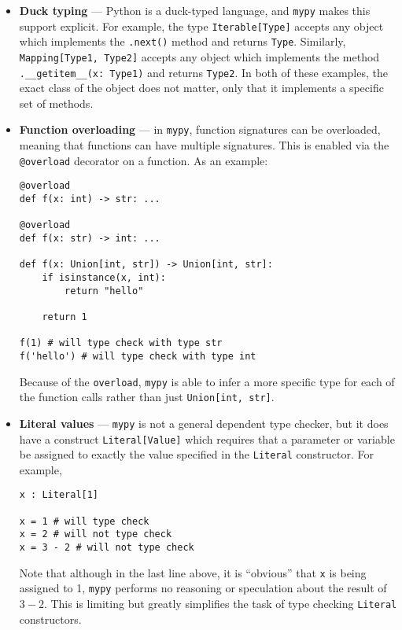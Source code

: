 \documentclass[12pt]{report}
\begin{document}
\begin{itemize}
    \item \textbf{Duck typing} --- Python is a duck-typed language, and \texttt{mypy} makes this support explicit. For example, the type \texttt{Iterable[Type]} accepts any object which implements the \texttt{.next()} method and returns \texttt{Type}. Similarly, \texttt{Mapping[Type1, Type2]} accepts any object which implements the method \texttt{.__getitem__(x: Type1)} and returns \texttt{Type2}. In both of these examples, the exact class of the object does not matter, only that it implements a specific set of methods.

    \item \textbf{Function overloading} --- in \texttt{mypy}, function signatures can be overloaded, meaning that functions can have multiple signatures. This is enabled via the \texttt{@overload} decorator on a function. As an example:

    \begin{singlespace*}
    \begin{verbatim}
@overload
def f(x: int) -> str: ...

@overload
def f(x: str) -> int: ...

def f(x: Union[int, str]) -> Union[int, str]:
    if isinstance(x, int):
        return "hello"

    return 1

f(1) # will type check with type str
f('hello') # will type check with type int\end{verbatim}
    \end{singlespace*}
    Because of the \texttt{overload}, \texttt{mypy} is able to infer a more specific type for each of the function calls rather than just \texttt{Union[int, str]}.

    \item \textbf{Literal values} --- \texttt{mypy} is not a general dependent type checker, but it does have a construct \texttt{Literal[Value]} which requires that a parameter or variable be assigned to exactly the value specified in the \texttt{Literal} constructor. For example,

    \begin{singlespace*}
        \begin{verbatim}
x : Literal[1]

x = 1 # will type check
x = 2 # will not type check
x = 3 - 2 # will not type check\end{verbatim}
    \end{singlespace*}
    Note that although in the last line above, it is ``obvious'' that \texttt{x} is being assigned to 1, \texttt{mypy} performs no reasoning or speculation about the result of $3 - 2$. This is limiting but greatly simplifies the task of type checking \texttt{Literal} constructors.

\end{itemize}
\end{document}
